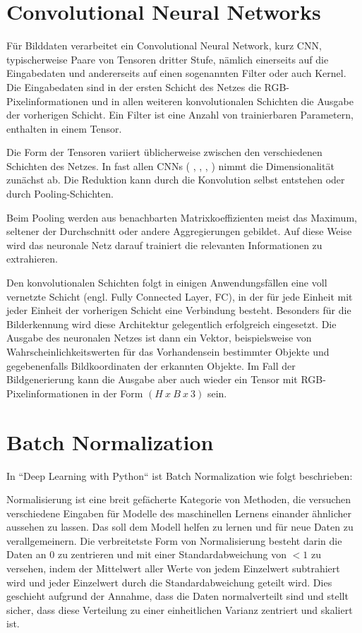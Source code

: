 \section{Convolutional Neural Networks}
\label{sec:cnn}
Für Bilddaten verarbeitet ein Convolutional Neural Network, kurz CNN, typischerweise Paare von Tensoren dritter Stufe, nämlich einerseits auf die Eingabedaten und andererseits auf einen sogenannten Filter oder auch Kernel. Die Eingabedaten sind in der ersten Schicht des Netzes die RGB-Pixelinformationen und in allen weiteren konvolutionalen Schichten die Ausgabe der vorherigen Schicht. Ein Filter ist eine Anzahl von trainierbaren Parametern, enthalten in einem Tensor.

Die Form der Tensoren variiert üblicherweise zwischen den verschiedenen Schichten des Netzes. In fast allen CNNs ( \cite{isola2018imagetoimage}, \cite{goodfellow2016deeplearning}, \cite{Lecun99objectrecognition}, \cite{ronneberger2015unet}) nimmt die Dimensionalität zunächst ab. Die Reduktion kann durch die Konvolution selbst entstehen oder durch Pooling-Schichten.

Beim Pooling werden aus benachbarten Matrixkoeffizienten meist das Maximum, seltener der Durchschnitt oder andere Aggregierungen gebildet. Auf diese Weise wird das neuronale Netz darauf trainiert die relevanten Informationen zu extrahieren. \cite{goodfellow2016deeplearning}

Den konvolutionalen Schichten folgt in einigen Anwendungsfällen eine voll vernetzte Schicht (engl. Fully Connected Layer, FC), in der für jede Einheit mit jeder Einheit der vorherigen Schicht eine Verbindung besteht. Besonders für die Bilderkennung wird diese Architektur gelegentlich erfolgreich eingesetzt. Die Ausgabe des neuronalen Netzes ist dann ein Vektor, beispielsweise von Wahrscheinlichkeitswerten für das Vorhandensein bestimmter Objekte und gegebenenfalls Bildkoordinaten der erkannten Objekte. Im Fall der Bildgenerierung kann die Ausgabe aber auch wieder ein Tensor mit RGB-Pixelinformationen in der Form $(H\ x\ B\ x\ 3)$ sein.

\section{Batch Normalization}
In ``Deep Learning with Python`` \cite{chollet2021deep} ist Batch Normalization wie folgt beschrieben:

Normalisierung ist eine breit gefächerte Kategorie von Methoden, die versuchen verschiedene Eingaben für Modelle des maschinellen Lernens einander ähnlicher aussehen zu lassen. Das soll dem Modell helfen zu lernen und für neue Daten zu verallgemeinern. Die verbreitetste Form von Normalisierung besteht darin die Daten an $0$ zu zentrieren und mit einer Standardabweichung von $<1$ zu versehen, indem der Mittelwert aller Werte von jedem Einzelwert subtrahiert wird und jeder Einzelwert durch die Standardabweichung geteilt wird. Dies geschieht aufgrund der Annahme, dass die Daten normalverteilt sind und stellt sicher, dass diese Verteilung zu einer einheitlichen Varianz zentriert und skaliert ist.

